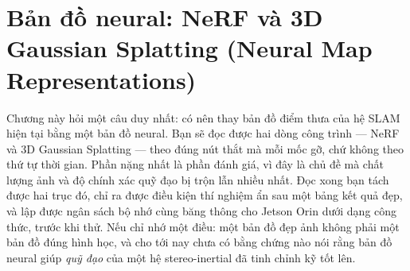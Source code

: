 \documentclass[../../deep_learning.tex]{subfiles}
\begin{document}
\chapter{Bản đồ neural: NeRF và 3D Gaussian Splatting (Neural Map Representations)}

\begin{tomtat}
Chương này hỏi một câu duy nhất: có nên thay bản đồ điểm thưa của hệ SLAM hiện tại bằng một bản đồ neural. Bạn sẽ đọc được hai dòng công trình --- NeRF và 3D Gaussian Splatting --- theo đúng nút thắt mà mỗi mốc gỡ, chứ không theo thứ tự thời gian. Phần nặng nhất là phần đánh giá, vì đây là chủ đề mà chất lượng ảnh và độ chính xác quỹ đạo bị trộn lẫn nhiều nhất. Đọc xong bạn tách được hai trục đó, chỉ ra được điều kiện thí nghiệm ẩn sau một bảng kết quả đẹp, và lập được ngân sách bộ nhớ cùng băng thông cho Jetson Orin dưới dạng công thức, trước khi thử. Nếu chỉ nhớ một điều: một bản đồ đẹp ảnh không phải một bản đồ đúng hình học, và cho tới nay chưa có bằng chứng nào nói rằng bản đồ neural giúp \emph{quỹ đạo} của một hệ stereo-inertial đã tinh chỉnh kỹ tốt lên.
\end{tomtat}
\end{document}
